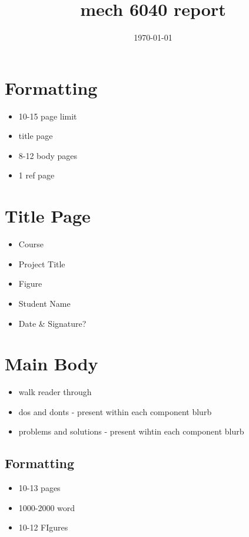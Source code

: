 \documentclass[11pt]{article}
\date{\today}
\title{mech 6040 report}
\begin{document}
\maketitle
\tableofcontents


\section{Formatting}
\label{sec:org7ed4d4c}
\begin{itemize}
\item 10-15 page limit
\item title page
\item 8-12 body pages
\item 1 ref page
\end{itemize}

\section{Title Page}
\label{sec:org4df4ac0}
\begin{itemize}
\item Course
\item Project Title
\item Figure
\item Student Name
\item Date \& Signature?
\end{itemize}

\section{Main Body}
\label{sec:orgb091496}
\begin{itemize}
\item walk reader through
\item dos and donts - present within each component blurb
\item problems and solutions - present wihtin each component blurb
\end{itemize}

\subsection{Formatting}
\label{sec:orgdd1802a}
\begin{itemize}
\item 10-13 pages
\item 1000-2000 word
\item 10-12 FIgures
\end{itemize}
\end{document}

